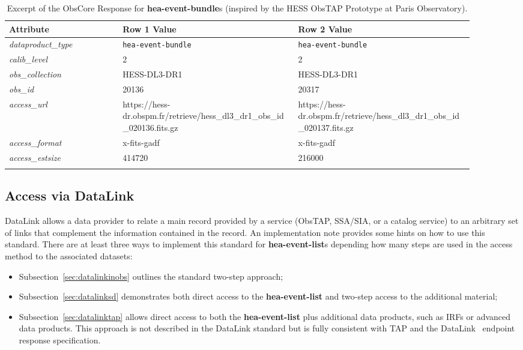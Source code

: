 \begin{longtable}{|m{0.22\linewidth}|m{0.34\linewidth}|m{0.34\linewidth}|}
\hline
{\bf Attribute}&{\bf Row 1 Value}&{\bf Row 2 Value}\\
\hline
{\em dataproduct\_type\/}& {\tt hea-event-bundle}&{\tt hea-event-bundle}\\
\hline
{\em calib\_level\/}& 2&2\\
\hline
{\em obs\_collection\/}& HESS-DL3-DR1&HESS-DL3-DR1\\
\hline
{\em obs\_id\/}&20136&20317\\
\hline
{\em access\_url\/}& \footnotesize{https://hess-dr.obspm.fr/\newline retrieve/hess\_dl3\_dr1\_obs\newline\_id\_020136.fits.gz}&\footnotesize{https://hess-dr.obspm.fr/\newline retrieve/hess\_dl3\_dr1\_obs\newline\_id\_020137.fits.gz}\\
\hline
{\em access\_format\/}&x-fits-gadf&x-fits-gadf\\
\hline
{\em access\_estsize\/}&414720&216000\\
\hline
\caption{Excerpt of the ObsCore Response for {\bf hea-event-bundle}s (inspired by the \gls{HESS} ObsTAP Prototype at Paris Observatory).}
\label{tab:bundle}
\end{longtable}

\subsection{Access via DataLink}
\label{sec:datalink}


DataLink \citep{2023ivoa.spec.1215B} allows a data provider to relate a main record provided by a service (ObsTAP, SSA/SIA, or a catalog service) to an arbitrary set of links that complement the information contained in the record. An implementation note \citep{2024ivoa.note.datalink} provides some hints on how to use this standard.
There are at least three ways to implement this standard for {\bf hea-event-list}s depending how many steps are used in the access method to the associated datasets:
 \begin{itemize}
	\item Subsection~\ref{sec:datalinkinobs} outlines the standard two-step approach;
	\item Subsection~\ref{sec:datalinksd} demonstrates both direct access to the {\bf hea-event-list} and two-step access to the additional material;
 	\item Subsection~\ref{sec:datalinktap} allows direct access to both the {\bf hea-event-list} plus additional data products, such as \glspl{IRF} or advanced data products.  This approach is not described in the DataLink standard but is fully consistent with TAP and the DataLink \blinks\ endpoint response specification.
 \end{itemize}

